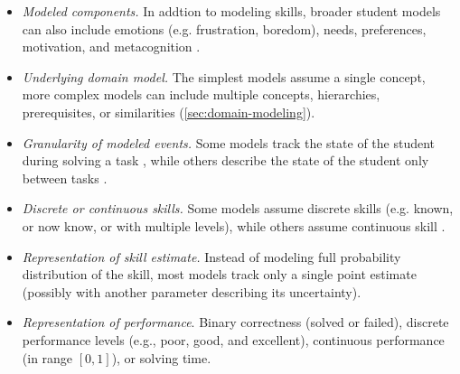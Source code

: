 \begin{itemize}
\item \emph{Modeled components.}
In addtion to modeling skills, broader student models can also
include emotions (e.g. frustration, boredom), needs, preferences, motivation,
and metacognition \cite[ch.\,10]{affect-sensor-free,its-review-2010}.
\item \emph{Underlying domain model.}
The simplest models assume a single concept,
more complex models can include multiple concepts,
hierarchies, prerequisites, or similarities (\cref{sec:domain-modeling}).
\item \emph{Granularity of modeled events.}
Some models track the state of the student during solving a task
\cite{bkt, sqltutor}, %
while others describe the state of the student only between tasks %
\cite{kli-framework}. %
\item \emph{Discrete or continuous skills.}
Some models assume discrete skills (e.g. known, or now know, or with multiple levels),
while others assume continuous skill
\cite{pelanek-learner-modeling}.
\item \emph{Representation of skill estimate.}
Instead of modeling full probability distribution of the skill, %
most models track only a single point estimate
(possibly with another parameter describing its uncertainty).
\item \emph{Representation of performance}.
  Binary correctness (solved or failed),
  discrete performance levels (e.g., poor, good, and excellent),
  continuous performance (in range $[0, 1]$),
  or solving time.

\end{itemize}
